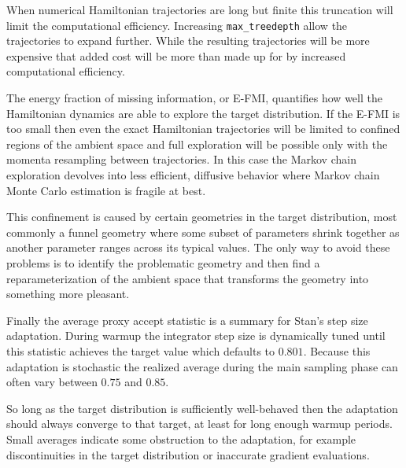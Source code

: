 \documentclass[
  letterpaper,
  DIV=11,
  numbers=noendperiod]{scrartcl}
\begin{document}
When numerical Hamiltonian trajectories are long but finite this
truncation will limit the computational efficiency. Increasing
\texttt{max\_treedepth} allow the trajectories to expand further. While
the resulting trajectories will be more expensive that added cost will
be more than made up for by increased computational efficiency.

The energy fraction of missing information, or E-FMI, quantifies how
well the Hamiltonian dynamics are able to explore the target
distribution. If the E-FMI is too small then even the exact Hamiltonian
trajectories will be limited to confined regions of the ambient space
and full exploration will be possible only with the momenta resampling
between trajectories. In this case the Markov chain exploration devolves
into less efficient, diffusive behavior where Markov chain Monte Carlo
estimation is fragile at best.

This confinement is caused by certain geometries in the target
distribution, most commonly a funnel geometry where some subset of
parameters shrink together as another parameter ranges across its
typical values. The only way to avoid these problems is to identify the
problematic geometry and then find a reparameterization of the ambient
space that transforms the geometry into something more pleasant.

Finally the average proxy accept statistic is a summary for Stan's step
size adaptation. During warmup the integrator step size is dynamically
tuned until this statistic achieves the target value which defaults to
\(0.801\). Because this adaptation is stochastic the realized average
during the main sampling phase can often vary between \(0.75\) and
\(0.85\).

So long as the target distribution is sufficiently well-behaved then the
adaptation should always converge to that target, at least for long
enough warmup periods. Small averages indicate some obstruction to the
adaptation, for example discontinuities in the target distribution or
inaccurate gradient evaluations.
\end{document}
